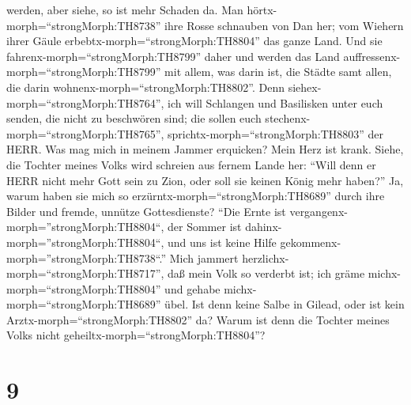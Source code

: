 werden, aber siehe, so ist mehr Schaden da.  Man
hörtx-morph=``strongMorph:TH8738'' ihre Rosse schnauben von Dan her; vom
Wiehern ihrer Gäule erbebtx-morph=``strongMorph:TH8804'' das ganze Land.
Und sie fahrenx-morph=``strongMorph:TH8799'' daher und werden das Land
auffressenx-morph=``strongMorph:TH8799'' mit allem, was darin ist, die
Städte samt allen, die darin wohnenx-morph=``strongMorph:TH8802''.
 Denn siehex-morph=``strongMorph:TH8764'', ich will
Schlangen und Basilisken unter euch senden, die nicht zu beschwören
sind; die sollen euch stechenx-morph=``strongMorph:TH8765'',
sprichtx-morph=``strongMorph:TH8803'' der HERR.  Was mag
mich in meinem Jammer erquicken? Mein Herz ist krank. 
Siehe, die Tochter meines Volks wird schreien aus fernem Lande her:
``Will denn er HERR nicht mehr Gott sein zu Zion, oder soll sie keinen
König mehr haben?'' Ja, warum haben sie mich so
erzürntx-morph=``strongMorph:TH8689'' durch ihre Bilder und fremde,
unnütze Gottesdienste?  ``Die Ernte ist
vergangenx-morph=''strongMorph:TH8804``, der Sommer ist
dahinx-morph=''strongMorph:TH8804``, und uns ist keine Hilfe
gekommenx-morph=''strongMorph:TH8738``.''  Mich jammert
herzlichx-morph=``strongMorph:TH8717'', daß mein Volk so verderbt ist;
ich gräme michx-morph=``strongMorph:TH8804'' und gehabe
michx-morph=``strongMorph:TH8689'' übel.  Ist denn keine
Salbe in Gilead, oder ist kein Arztx-morph=``strongMorph:TH8802'' da?
Warum ist denn die Tochter meines Volks nicht
geheiltx-morph=``strongMorph:TH8804''?

\hypertarget{section-8}{%
\section{9}\label{section-8}}

